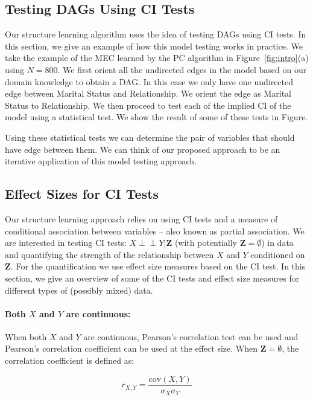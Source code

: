 \documentclass{uai2025} %
\def\ci{\perp\!\!\!\!\!\perp}
\begin{document}
\subsection{Testing DAGs Using CI Tests}
Our structure learning algorithm uses the idea of testing DAGs using CI tests.
In this section, we give an example of how this model testing works in
practice. We take the example of the MEC learned by the PC algorithm in
Figure~\ref{fig:intro}(a) using $ N=800 $. We first orient all the undirected
edges in the model based on our domain knowledge to obtain a DAG. In this case
we only have one undirected edge between Marital Status and Relationship. We 
orient the edge as Marital Status to Relationship. We then proceed to test
each of the implied CI of the model using a statistical test. We show the result
of some of these tests in Figure.

Using these statistical tests we can determine the pair of variables that
should have edge between them. We can think of our proposed approach to be an
iterative application of this model testing approach.

\subsection{Effect Sizes for CI Tests}

Our structure learning approach relies on using CI tests and a measure of
conditional association between variables -- also known as partial association.
We are interested in testing CI tests: $ X \ci Y \rvert \bm{Z} $ (with
potentially $ \bm{Z} = \emptyset $) in data and quantifying the strength of the
relationship between $ X $ and $ Y $ conditioned on $ \bm{Z} $. For the
quantification we use effect size measures based on the CI test. In this
section, we give an overview of some of the CI tests and effect size measures
for different types of (possibly mixed) data.

\paragraph{Both $ X $ and $ Y $ are continuous: }
When both $ X $ and $ Y $ are continuous, Pearson's correlation test can be
used and Pearson's correlation coefficient can be used at the effect size. When
$ \bm{Z} = \emptyset $, the correlation coefficient is defined as:

\begin{equation}
	r_{X, Y} = \frac{\mathrm{cov}(X, Y)}{\sigma_X \sigma_Y}
\end{equation}
\end{document}
